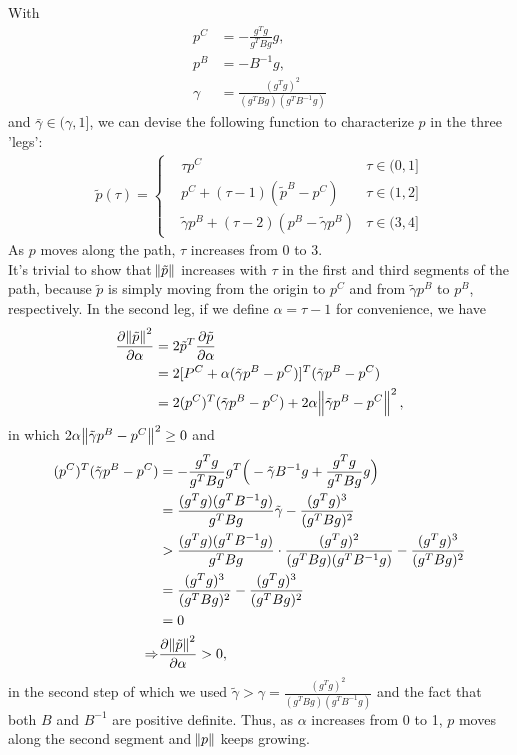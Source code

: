 \documentclass[11pt]{article}
\begin{document}
\maketitle
\section{}
With 
\begin{equation}\begin{split} 
p^C &= -\frac{g^Tg}{g^TBg}g, \\
p^B &= -B^{-1}g, \\
\gamma &= \frac{(g^Tg)^2}{(g^TBg)(g^TB^{-1}g)}
\end{split}\nonumber\end{equation} 
and $\bar\gamma\in(\gamma,1]$, we can devise the following function to characterize $p$ in the three 'legs':
\begin{equation}\begin{split} 
\tilde p(\tau)=\left\{
\begin{array}{rcl}
&\tau p^C & {\tau \in (0,1]}\\
&p^C + (\tau-1)(\tilde p^B - p^C) & {\tau \in (1,2]}\\
&\tilde \gamma p^B + (\tau - 2) (p^B - \tilde\gamma p^B) & {\tau \in (3,4]}
\end{array} \right.
\end{split}\nonumber\end{equation}
As $p$ moves along the path, $\tau$ increases from $0$ to $3$. \\[0.3cm]
It's trivial to show that $\norm{\tilde p}$ increases with $\tau$ in the first and third segments of the path, because $\tilde p$ is simply moving from the origin to $p^C$ and from $\tilde\gamma p^B$ to $p^B$, respectively. In the second leg, if we define $\alpha = \tau - 1$ for convenience, we have 
\begin{equation}\begin{split} 
\frac{\partial \norm{\tilde p}^2}{\partial \alpha} &= 2\tilde p^T \frac{\partial \tilde p}{\partial\alpha}\\
&= 2[P^C + \alpha (\tilde\gamma p^B-p^C)]^T(\tilde\gamma p^B - p^C) \\
&=2(p^C)^T(\tilde \gamma p^B-p^C) + 2\alpha\norm{\tilde\gamma p^B - p^C}^2,
\end{split}\nonumber\end{equation} 
in which $2\alpha\norm{\tilde\gamma p^B - p^C}^2\geq 0$ and 
\begin{equation}\begin{split} 
(p^C)^T(\tilde\gamma p^B-p^C) & = -\frac{g^Tg}{g^TBg}g^T\Big( -\tilde\gamma B^{-1}g + \frac{g^Tg}{g^TBg}g \Big)\\
&= \frac{(g^Tg)(g^TB^{-1}g)}{g^TBg}\tilde\gamma - \frac{(g^Tg)^3}{(g^TBg)^2}\\
&> \frac{(g^Tg)(g^TB^{-1}g)}{g^TBg}\cdot \frac{(g^Tg)^2}{(g^TBg)(g^TB^{-1}g)} - \frac{(g^Tg)^3}{(g^TBg)^2}\\
&=\frac{(g^Tg)^3}{(g^TBg)^2} - \frac{(g^Tg)^3}{(g^TBg)^2}\\
&=0 \\
\Rightarrow &\frac{\partial\norm{\tilde p}^2}{\partial \alpha} >0,
\end{split}\nonumber\end{equation} 
in the second step of which we used $\tilde \gamma > \gamma = \frac{(g^Tg)^2}{(g^TBg)(g^TB^{-1}g)}$ and the fact that both $B$ and $B^{-1}$ are positive definite. Thus, as $\alpha$ increases from 0 to 1, $p$ moves along the second segment and $\norm{p}$ keeps growing.
\end{document}
